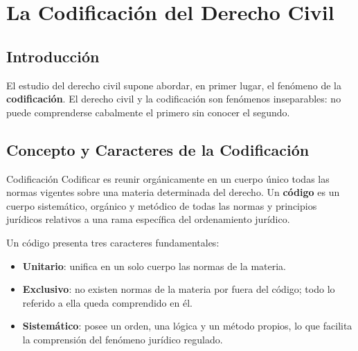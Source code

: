 \documentclass[12pt,oneside]{book}
\begin{document}

\tableofcontents

\clearpage


\chapter{La Codificación del Derecho Civil}

\section{Introducción}

El estudio del derecho civil supone abordar, en primer lugar, el fenómeno de la \textbf{codificación}. El derecho civil y la codificación son fenómenos inseparables: no puede comprenderse cabalmente el primero sin conocer el segundo.

\section{Concepto y Caracteres de la Codificación}

\begin{definition}{Codificación}
Codificar es reunir orgánicamente en un cuerpo único todas las normas vigentes sobre una materia determinada del derecho. Un \textbf{código} es un cuerpo sistemático, orgánico y metódico de todas las normas y principios jurídicos relativos a una rama específica del ordenamiento jurídico.
\end{definition}

Un código presenta tres caracteres fundamentales:

\begin{itemize}
    \item \textbf{Unitario}: unifica en un solo cuerpo las normas de la materia.
    \item \textbf{Exclusivo}: no existen normas de la materia por fuera del código; todo lo referido a ella queda comprendido en él.
    \item \textbf{Sistemático}: posee un orden, una lógica y un método propios, lo que facilita la comprensión del fenómeno jurídico regulado.
\end{itemize}
\end{document}
